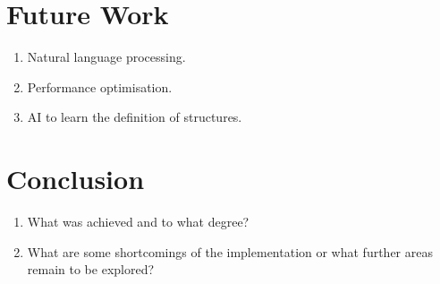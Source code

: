 \documentclass[11pt, a4paper]{article}
\begin{document}
\begin{flushleft}
\section*{Future Work}
\begin{enumerate}
    \item Natural language processing.
    \item Performance optimisation.
    \item AI to learn the definition of structures.
\end{enumerate}

\section*{Conclusion}
\begin{enumerate}
    \item What was achieved and to what degree?
    \item What are some shortcomings of the implementation or what further areas remain to be explored?
\end{enumerate}
    
\end{flushleft}
\end{document}
